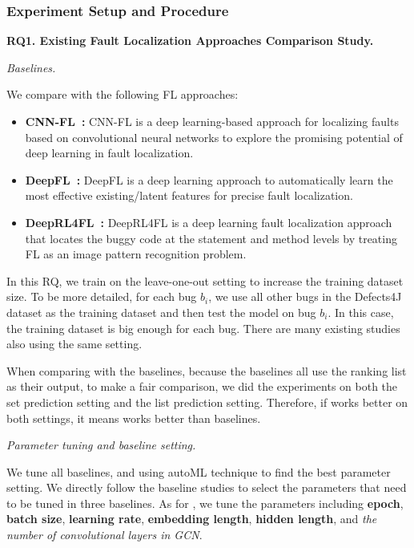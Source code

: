 \subsubsection{Experiment Setup and Procedure}
\hspace{1cm}

{\bf RQ1. Existing Fault Localization Approaches Comparison Study.}

\textit{Baselines.}

We compare {\tool} with the following FL approaches:

\begin{itemize}
	\item \textbf{CNN-FL~\cite{zhang2019cnn}:} CNN-FL is a deep learning-based approach for localizing faults based on convolutional neural networks to explore the promising potential of deep learning in fault localization.
	
	\item \textbf{DeepFL~\cite{DeepFL}:} DeepFL is a deep learning approach to automatically learn the most effective existing/latent features for precise fault localization.
	
	\item \textbf{DeepRL4FL~\cite{li2021fault}:} DeepRL4FL is a deep learning fault localization approach that locates the buggy code at the statement and method levels by treating FL as an image pattern recognition problem.
\end{itemize}

In this RQ, we train \tool on the leave-one-out setting to increase the training dataset size. To be more detailed, for each bug $b_i$, we use all other bugs in the Defects4J dataset as the training dataset and then test the model on bug $b_i$. In this case, the training dataset is big enough for each bug. There are many existing studies \cite{DeepFL, TraPT} also using the same setting. 

When comparing with the baselines, because the baselines all use the ranking list as their output, to make a fair comparison, we did the experiments on both the set prediction setting and the list prediction setting. Therefore, if \tool works better on both settings, it means \tool works better than baselines.

{\it Parameter tuning and baseline setting.}

We tune all baselines, and \tool using autoML technique \cite{NNI} to find the best parameter setting. We directly follow the baseline studies to select the parameters that need to be tuned in three baselines. As for \tool, we tune the parameters including {\bf epoch}, {\bf batch size}, {\bf learning rate}, {\bf embedding length}, {\bf hidden length}, and {\it the number of convolutional layers in GCN}.

